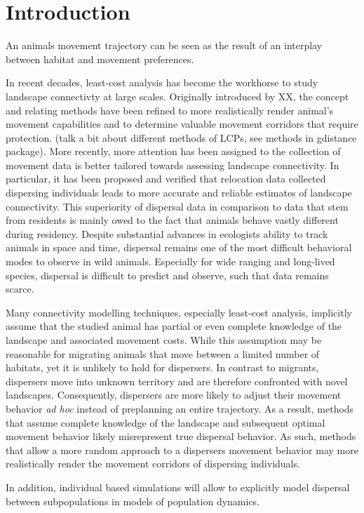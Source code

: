 \documentclass[abstract=on,10pt,a4paper,bibliography=totocnumbered]{article}
\begin{document}
\section{Introduction}
An animals movement trajectory can be seen as the result of an interplay between
habitat and movement preferences.

In recent decades, least-cost analysis has become the workhorse to study
landscape connectivty at large scales. Originally introduced by XX, the concept
and relating methods have been refined to more realistically render animal's
movement capabilities and to determine valuable movement corridors that require
protection. (talk a bit about different methods of LCPs, see methods in
gdistance package). More recently, more attention has been assigned to the
collection of movement data is better tailored towards assessing landscape
connectivity. In particular, it has been proposed and verified that relocation
data collected dispersing individuals leads to more accurate and reliable
estimates of landscape connectivity. This superiority of dispersal data in
comparison to data that stem from residents is mainly owed to the fact that
animals behave vastly different during residency. Despite substantial advances
in ecologists ability to track animals in space and time, dispersal remains one
of the most difficult behavioral modes to observe in wild animals. Especially
for wide ranging and long-lived species, dispersal is difficult to predict and
observe, such that data remains scarce.

Many connectivity modelling techniques, especially least-cost analysis,
implicitly assume that the studied animal has partial or even complete knowledge
of the landscape and associated movement costs. While this assumption may be
reasonable for migrating animals that move between a limited number of habitats,
yet it is unlikely to hold for dispersers. In contrast to migrants, dispersers
move into unknown territory and are therefore confronted with novel landscapes.
Consequently, dispersers are more likely to adjust their movement behavior
\textit{ad hoc} instead of preplanning an entire trajectory. As a result,
methods that assume complete knowledge of the landscape and subsequent optimal
movement behavior likely misrepresent true dispersal behavior. As such, methods
that allow a more random approach to a dispersers movement behavior may more
realistically render the movement corridors of dispersing individuals.

In addition, individual based simulations will allow to explicitly model
dispersal between subpopulations in models of population dynamics.
\end{document}
